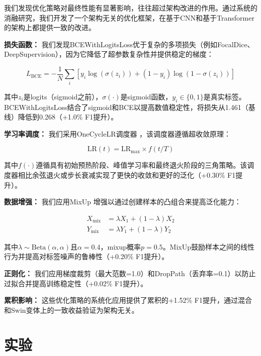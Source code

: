 \documentclass[journal]{IEEEtran}
\begin{document}
我们发现优化策略对最终性能有显著影响，往往超过架构改进的作用。通过系统的消融研究，我们开发了一个架构无关的优化框架，在基于CNN和基于Transformer的架构上都提供一致的改进。

\textbf{损失函数：} 我们发现BCEWithLogitsLoss优于复杂的多项损失（例如FocalDice、DeepSupervision），因为它降低了超参数复杂性并提供稳定的梯度：

\begin{equation}
L_{\text{BCE}} = -\frac{1}{N} \sum_i [y_i \log(\sigma(z_i)) + (1-y_i) \log(1-\sigma(z_i))]
\label{eq:bce}
\end{equation}

其中$z_i$是logits（sigmoid之前），$\sigma(\cdot)$是sigmoid函数，$y_i \in \{0,1\}$是真实标签。BCEWithLogitsLoss结合了sigmoid和BCE以提高数值稳定性，将损失从1.461（基线）降低到0.268（+1.0\% F1提升）。

\textbf{学习率调度：} 我们采用OneCycleLR调度器 \cite{smith2018cyclical}，该调度器遵循超收敛原理：

\begin{equation}
\text{LR}(t) = \text{LR}_{\text{max}} \times f(t/T)
\label{eq:lr}
\end{equation}

其中$f(\cdot)$遵循具有初始预热阶段、峰值学习率和最终退火阶段的三角策略。该调度器相比余弦退火或步长衰减实现了更快的收敛和更好的泛化（+0.30\% F1提升）。

\textbf{数据增强：} 我们应用MixUp \cite{zhang2018mixup}增强以通过创建样本的凸组合来提高泛化能力：

\begin{equation}
\begin{aligned}
X_{\text{mix}} &= \lambda X_1 + (1-\lambda) X_2 \\
Y_{\text{mix}} &= \lambda Y_1 + (1-\lambda) Y_2
\end{aligned}
\label{eq:mixup}
\end{equation}

其中$\lambda \sim \text{Beta}(\alpha, \alpha)$且$\alpha=0.4$，mixup概率$p=0.5$。MixUp鼓励样本之间的线性行为并提高对标签噪声的鲁棒性（+0.20\% F1提升）。

\textbf{正则化：} 我们应用梯度裁剪（最大范数=1.0）和DropPath（丢弃率=0.1）以防止过拟合并提高训练稳定性（+0.02\% F1提升）。

\textbf{累积影响：} 这些优化策略的系统化应用提供了累积的+1.52\% F1提升，通过混合和Swin变体上的一致收益验证为架构无关。

\section{实验}
\end{document}
